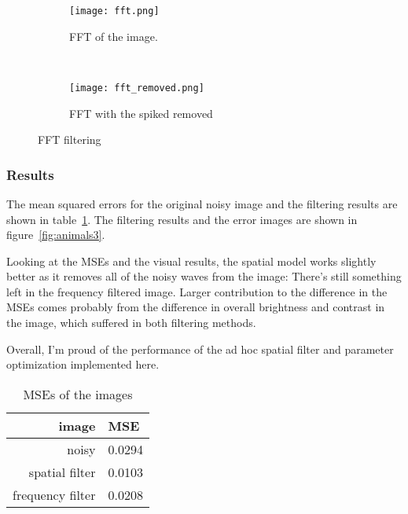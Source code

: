 \documentclass{article}
\begin{document}
\begin{spacing}{1.1}
{\begin{figure}
        \centering
        \begin{subfigure}[b]{0.5\textwidth}
                \texttt{[image: fft.png]}
                \caption{FFT of the image.}
                \label{fig:fft1}
        \end{subfigure}%
        ~ %
        \begin{subfigure}[b]{0.5\textwidth}
                \texttt{[image: fft\_removed.png]}
                \caption{FFT with the spiked removed}
                \label{fig:fft2}
        \end{subfigure}
        \caption{FFT filtering}\label{fig:animals1}
\end{figure}

\subsubsection{Results}

The mean squared errors for the original noisy image and the filtering results
are shown in table~\ref{tab:mse}. The filtering
results and the error images are shown in figure~\ref{fig:animals3}.

Looking at the MSEs and the visual results, the spatial model works slightly
better as it removes all of the noisy waves from the image: There's still
something left in the frequency filtered image. Larger contribution to the
difference in the MSEs comes probably from the difference in overall brightness
and contrast in the image, which suffered in both filtering methods.

Overall, I'm proud of the performance of the ad hoc spatial filter and
parameter optimization implemented here.

\begin{table}[h]
    \centering
    \caption{MSEs of the images}
    \label{tab:mse}
    \begin{tabular}{rl}
        \toprule
        image & MSE\\
        \midrule
        noisy &  0.0294\\
    spatial filter&   0.0103\\
      frequency filter & 0.0208\\
        \bottomrule
    \end{tabular}
\end{table}

}
\end{spacing}
\end{document}
